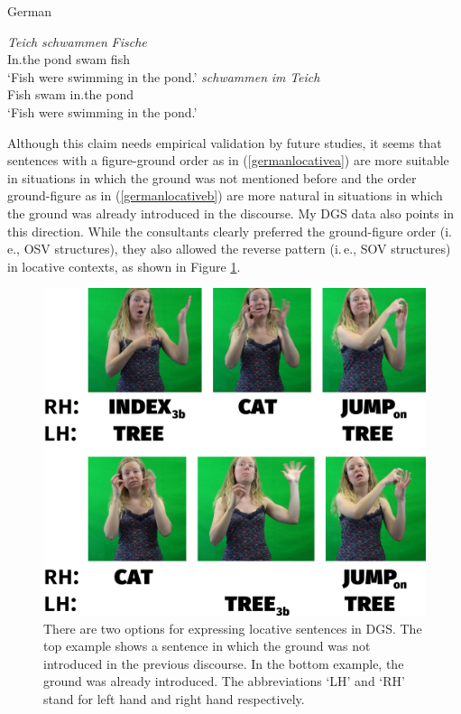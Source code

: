 \begin{exe}
\ex German \label{germanlocative}\begin{xlist} 
\ex {} {\textit{Teich}} {\textit{schwammen}} {\textit{Fische}}\\
{In.the} {pond} {swam} {fish}  \\
\trans `Fish were swimming in the pond.' \label{germanlocativea}
\ex {} {\textit{schwammen}} {\textit{im}} {\textit{Teich}}  \\
{Fish} {swam} {in.the} {pond} \\
\trans `Fish were swimming in the pond.' \label{germanlocativeb}

\end{xlist}
\end{exe} 

\noindent Although this claim needs empirical validation by future studies, it seems that sentences with a figure-ground order as in (\ref{germanlocativea}) are more suitable in situations in which the ground was not mentioned before and the order ground-figure as in  (\ref{germanlocativeb}) are more natural in situations in which the ground was already introduced in the discourse. My DGS data also points in this direction. While the consultants clearly preferred the ground-figure order (i.\,e., OSV structures), they also allowed the reverse pattern (i.\,e., SOV structures) in locative contexts, as shown in  Figure \ref{fig:figuregroundcat}.

\begin{figure}[bt]
\centering
	\includegraphics[width=1.0\textwidth]{figuregroundcat.jpg}
	\caption{There are two options for expressing locative sentences in DGS. The top example shows a sentence in which the ground was not introduced in the previous discourse. In the bottom example, the ground was already introduced. The abbreviations `LH' and `RH' stand for left hand and right hand respectively.}
	\label{fig:figuregroundcat}
\end{figure}

